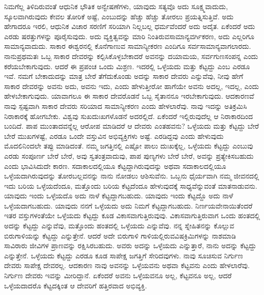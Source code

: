 ನಿಮಗೆಲ್ಲ ತಿಳಿದಿರುವಂತೆ ಆಧುನಿಕ ಭೌತಿಕ ಅನ್ವೇಷಣೆಗಳು, ಯಾವುದು ಸತ್ಯವೊ ಅದು ಸೂಕ್ಷ್ಮವಾದುದು, ಸ್ಕೂಲವಾಗಿರುವುದು ಕೇವಲ ತೋರಿಕೆ ಅಷ್ಟೆ, ಎಂಬುದನ್ನು ಹೆಚ್ಚು ಹೆಚ್ಚು ತೋರಲು ಪ್ರಯತ್ನಿಸುತ್ತಿವೆ. ಅದು ಹೇಗಾದರೂ ಇರಲಿ, ಆಧುನಿಕ ವಿಚಾರ ಸರಣಿಗೆ ಸರಿಯಾಗಿ ನಿಲ್ಲಬಲ್ಲ ಧರ್ಮವೆಂದರೆ ಅದು ಅದೈತ. ಏಕೆಂದರೆ ಅದು ಎರಡು ಷರತ್ತುಗಳನ್ನು ಪೂರೈಸುವುದು. ಅದು ವ್ಯಕ್ತಿತ್ವವನ್ನು ಮಾರಿ ನಿಂತಿರುವ\break ಸಾಮಾನ್ಯವರ್ಗಿಕರಣ, ಅದು ಎಲ್ಲರಿಗೂ ಸಾಮಾನ್ಯವಾದುದು. ಸಾಕಾರ ಈಶ್ವರನಲ್ಲಿ ಕೊನೆಗಾಣುವ ಸಾಮಾನ್ಯೀಕರಣ ಎಂದಿಗೂ ಸರ್ವಸಾಮಾನ್ಯವಾಗಲಾರದು. ನಾನು\break ಪ್ರಥಮತಃ ಒಬ್ಬ ಸಾಕಾರ ದೇವರನ್ನು ಕಲ್ಪಿಸಿಕೊಳ್ಳಬೇಕಾದರೆ ಅವನನ್ನು ದಯಾಮಯ, ಸರ್ವಗುಣಸಂಪನ್ನ ಎಂದು ಕರೆಯಬೇಕಾಗುವುದು. ಆದರೆ ಈ ಪ್ರಪಂಚ ಒಂದು ಮಿಶ್ರಣ. ಇದರಲ್ಲಿ ಒಳ್ಳೆಯದು ಮತ್ತು ಕೆಟ್ಟದ್ದು ಎಂಬ ಎರಡೂ ಇವೆ. ನಮಗೆ ಬೇಕಾದುದನ್ನು ಮಾತ್ರ ಬೇರೆ ತೆಗೆದುಕೊಂಡು ಅದನ್ನು ಸಾಕಾರ ದೇವರು ಎನ್ನುವೆವು, ನೀವು ಹೇಗೆ ಸಾಕಾರ ದೇವರನ್ನು ಅವನು ಅದು, ಅವನು ಇದು, ಎಂದು ಹೇಳುತ್ತೀರೋ ಹಾಗೆಯೇ ಅವನು ಅದಲ್ಲ, ಇದಲ್ಲ, ಎಂದು ಹೇಳಬೇಕಾಗುವುದು. ಯಾವಾಗಲೂ ಈ ಸಾಕಾರ ದೇವರೊಡನೆ ಒಬ್ಬ ಸೈತಾನನೂ ಇರಬೇಕಾಗುವುದು. ಆದಕಾರಣವೆ ನಾವು ಸ್ಪಷ್ಟವಾಗಿ ಸಾಕಾರ ದೇವರು ಸರಿಯಾದ ಸಾಮಾನ್ಯೀಕರಣ ಎಂದು ಹೇಳಲಾರೆವು. ನಾವು ಇದನ್ನು ಅತಿಕ್ರಮಿಸಿ ನಿರಾಕಾರಕ್ಕೆ ಹೋಗಬೇಕು. ವಿಶ್ವವು ಸುಖದುಃಖಗಳೊಡನೆ ಅದರಲ್ಲಿದೆ. ಏಕೆಂದರೆ ಇಲ್ಲಿರುವುದೆಲ್ಲ ಆ ನಿರಾಕಾರದಿಂದ ಬಂದಿದೆ. ಪಾಪ ಮುಂತಾದವನ್ನೆಲ್ಲ ಆರೋಪ ಮಾಡಿದರೆ ಆ ದೇವರು ಎಂತಹವನು? ಒಳ್ಳೆಯದು ಮತ್ತು ಕೆಟ್ಟದ್ದು ಬೇರೆ ಬೇರೆ ಮುಖಗಳಷ್ಟೆ, ಎರಡೂ ಒಂದೇ ವಸ್ತುವಿನ ಅಭಿವ್ಯಕ್ತಿಗಳು ಅಷ್ಟೆ. ಎರಡಿದ್ದವು ಎಂದು ಹೇಳುವುದು ಮೊದಲಿನಿಂದಲೇ ತಪ್ಪು ಮಾಡಿದಂತೆ. ನಮ್ಮ ಜಗತ್ತಿನಲ್ಲಿ ಎಷ್ಟೋ ಪಾಲು ದುಃಖಕ್ಕೆಲ್ಲ, ಒಳ್ಳೆಯದು ಕೆಟ್ಟದ್ದು ಎಂಬುವು ಎರಡು ಸಂಪೂರ್ಣ ಬೇರೆ ಬೇರೆ, ಅವು ಸ್ವತಂತ್ರವಾದುವು, ಪಾಪ ಪುಣ್ಯಗಳು ಬೇರೆ ಬೇರೆ, ಅವನ್ನು ಪ್ರತ್ಯೇಕಿಸಬಹುದು ಎಂದು ಭಾವಿಸಿದುದೇ ಕಾರಣ. ಸದಾಕಾಲದಲ್ಲಿಯೂ ಕೆಟ್ಟದ್ದಾಗಿರುವುದನ್ನು ಅಥವಾ ಸದಾಕಾಲದಲ್ಲಿಯೂ ಒಳ್ಳೆಯದಾಗಿರುವುದನ್ನು ತೋರಬಲ್ಲವನನ್ನು ನಾನು ನೋಡಲು ಆಶಿಸುವೆನು. ಒಬ್ಬನು ಧೈರ್ಯವಾಗಿ ನಮ್ಮ ಜೀವನದಲ್ಲಿ ಇದು ಬರಿಯ ಒಳ್ಳೆಯದೆಂದೂ, ಮತ್ತೊಂದು ಬರಿಯ ಕೆಟ್ಟದೆಂದೂ ಹೇಳುವುದಕ್ಕೆ ಸಾಧ್ಯವೆನ್ನುವಂತೆ ಮಾತನಾಡುವನು. ಯಾವುದು ಇಂದು ಒಳ್ಳೆಯದೊ ಅದು ನಾಳೆ ಕೆಟ್ಟದ್ದಾಗಬಹುದು. ಯಾವುದು ಇಂದು ಕೆಟ್ಟದ್ದೊ ಅದು ನಾಳೆ ಒಳ್ಳೆಯದಾಗಬಹುದು. ಯಾವುದು ನನಗೆ ಒಳ್ಳೆಯದು ಅದು ನಿಮಗೆ ಕೆಟ್ಟದ್ದಾಗಬಹುದು. ನಿರ್ಣಯವೇನಾಯಿತೆಂದರೆ ಇತರ ವಸ್ತುಗಳಂತೆಯೇ ಒಳ್ಳೆಯದು ಕೆಟ್ಟದ್ದು ಕೂಡ ವಿಕಾಸವಾಗುತ್ತಿರುವುವು. ವಿಕಾಸವಾಗುತ್ತಿರುವಾಗ ಒಂದು ಹಂತದಲ್ಲಿ ಅದನ್ನು ಕೆಟ್ಟದ್ದು ಎನ್ನುವೆವು, ಮತ್ತೊಂದು ಹಂತದಲ್ಲಿ ಒಳ್ಳೆಯದು ಎನ್ನುವೆವು. ನನ್ನ ಸ್ನೇಹಿತನನ್ನು ಕೊಲ್ಲುವ ಬಿರುಗಾಳಿಯನ್ನು ಕೆಟ್ಟದ್ದು ಎನ್ನುತ್ತೇನೆ. ಆದರೆ ಅದೇ ಬಿರುಗಾಳಿ ಗಾಳಿಯಲ್ಲಿರುವ\break ವಿಷಕ್ರಿಮಿಗಳನ್ನು ನಾಶಮಾಡಿ ಸಾವಿರಾರು ಜೀವಿಗಳ ಪ್ರಾಣವನ್ನು ರಕ್ಷಿಸಿರಬಹುದು. ಅವರು ಅದನ್ನು ಒಳ್ಳೆಯದು ಎನ್ನುತ್ತಾರೆ, ನಾನು ಅದನ್ನು ಕೆಟ್ಟದ್ದು ಎನ್ನುತ್ತೇನೆ. ಒಳ್ಳೆಯದು ಕೆಟ್ಟದ್ದು ಎರಡೂ ಕೂಡ ಸಾಪೇಕ್ಷ ಜಗತ್ತಿಗೆ ಸೇರಿದವುಗಳು. ನಾವು ಸೂಚಿಸುವ ನಿರ್ಗುಣ ದೇವರು ಸಾಪೇಕ್ಷ ದೇವರಲ್ಲ. ಆದಕಾರಣ ನಾವು ಅವನನ್ನು ಒಳ್ಳೆಯವನು ಅಥವಾ ಕೆಟ್ಟವನು ಎಂದು ಹೇಳಲಾರೆವು. ನಿರ್ಗುಣ ದೇವರು ಇವನ್ನು ಮೀರಿದ್ದಾನೆ. ಏಕೆಂದರೆ ಅವನು ಒಳ್ಳೆಯವನೂ ಅಲ್ಲ, ಕೆಟ್ಟವನೂ ಅಲ್ಲ, ಆದರೆ ಒಳ್ಳೆಯದಾದರೊ ಕೆಟ್ಟದಕ್ಕಿಂತ ಆ ದೇವರಿಗೆ ಹತ್ತಿರವಾದ ಅಭಿವ್ಯಕ್ತಿ.

